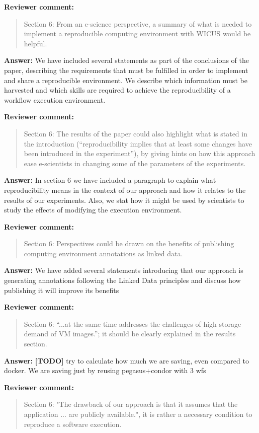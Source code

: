 \documentclass{letter}
\newenvironment{review}%
{\textbf{Reviewer comment:}\begin{quote}}%
{\end{quote}}%
\newcommand{\todo}[1]{%
      \color{red}\textbf{[TODO]} #1\color{black}}
\newcommand{\answer}[1]{%
      \textbf{Answer:} #1}
\begin{document}
\begin{letter}{}
\begin{review}
Section 6: From an e-science perspective, a summary of what is needed to implement a reproducible computing environment with WICUS would be helpful.
\end{review}

\answer{We have included several statements as part of the conclusions of the paper, describing the requirements that must be fulfilled in order to implement and share a reproducible environment. We describe which information must be harvested and which skills are required to achieve the reproducibility of a workflow execution environment.}


\begin{review}
Section 6: The results of the paper could also highlight what is stated in the introduction (``reproducibility implies that at least some changes have been introduced in the experiment''), by giving hints on how this approach ease e-scientists in changing some of the parameters of the experiments.
\end{review}

\answer{In section 6 we have included a paragraph to explain what reproducibility means in the context of our approach and how it relates to the results of our experiments. Also, we stat how it might be used by scientists to study the effects of modifying the execution environment.}


\begin{review}
Section 6: Perspectives could be drawn on the benefits of publishing computing environment annotations as linked data.
\end{review}

\answer{We have added several statements introducing that our approach is generating annotations following the Linked Data principles and discuss how publishing it will improve its benefits}

\begin{review}
Section 6: ``...at the same time addresses the challenges of high storage demand of VM images.''; it should be clearly explained in the results section.
\end{review}

\answer{\todo{try to calculate how much we are saving, even compared to docker. We are saving just by reusing pegasus+condor with 3 wfs}}


\begin{review}
Section 6: "The drawback of our approach is that it assumes that the application ...  are publicly available.", it is rather a necessary condition to reproduce a software execution.
\end{review}


\end{letter}
\end{document}
